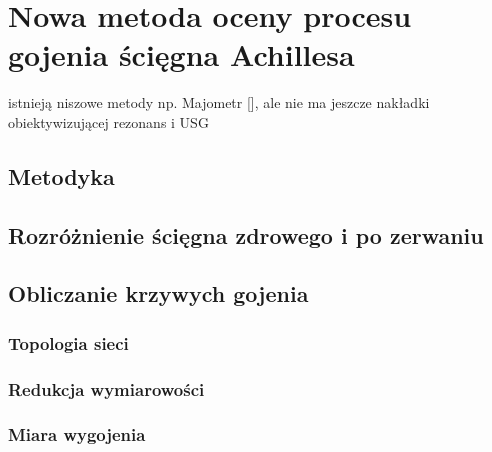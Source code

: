 \chapter{Nowa metoda oceny procesu gojenia ścięgna Achillesa}
\label{NewMethod}
istnieją niszowe metody np. Majometr [], ale nie ma jeszcze nakładki obiektywizującej rezonans i USG
\section{Metodyka}
\section{Rozróżnienie ścięgna zdrowego i po zerwaniu}
\section{Obliczanie krzywych gojenia}
\subsection{Topologia sieci}
\subsection{Redukcja wymiarowości}
\subsection{Miara wygojenia}